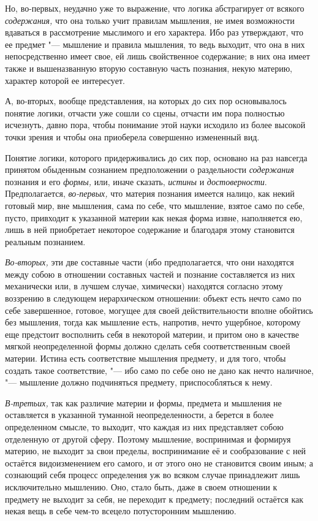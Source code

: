 Но, во-первых, неудачно уже то выражение, что логика абстрагирует от всякого
{\em содержания,} что она только учит правилам
мышления, не имея возможности вдаваться в рассмотрение мыслимого и его
характера. Ибо раз утверждают, что ее предмет "--- мышление и правила
мышления, то ведь выходит, что она в них непосредственно имеет свое, ей
лишь свойственное содержание; в них она имеет также и вышеназванную вторую
составную часть познания, некую материю, характер которой ее интересует.

А, во-вторых, вообще представления, на которых до сих пор
основывалось понятие логики, отчасти уже сошли со сцены, отчасти им
пора полностью исчезнуть, давно пора, чтобы понимание этой науки
исходило из более высокой точки зрения и чтобы она приоберела совершенно
измененный вид.

Понятие логики, которого придерживались до сих пор, основано на раз навсегда
принятом обыденным сознанием предположении о раздельности {\em содержания}
познания и его {\em формы,} или, иначе сказать, {\em истины} и
{\em достоверности}. Предполагается, {\em во-первых,} что материя познания
имеется налицо, как некий готовый мир, вне мышления, сама по себе, что
мышление, взятое само по себе, пусто, привходит к указанной материи как
некая форма извне, наполняется ею, лишь в ней приобретает некоторое
содержание и благодаря этому становится реальным познанием.

{\em Во-вторых,} эти две составные части (ибо
предполагается, что они находятся между собою в отношении составных частей
и познание составляется из них механически или, в лучшем случае, химически)
находятся согласно этому воззрению в следующем иерархическом отношении:
объект есть нечто само по себе завершенное, готовое, могущее для своей
действительности вполне обойтись без мышления, тогда как мышление есть,
напротив, нечто ущербное, которому еще предстоит восполнить себя в
некоторой материи, и притом оно в качестве мягкой неопределенной формы
должно сделать себя соответственным своей материи. Истина есть соответствие
мышления предмету, и для того, чтобы создать такое соответствие, "--- ибо само
по себе оно не дано как нечто наличное, "--- мышление должно подчиняться
предмету, приспособляться к нему.

{\em В-третьих,} так как различие материи и формы,
предмета и мышления не оставляется в указанной туманной неопределенности, а
берется в более определенном смысле, то выходит, что каждая из них
представляет собою отделенную от другой сферу. Поэтому мышление,
воспринимая и формируя материю, не выходит за свои пределы, воспринимание
её и сообразование с ней остаётся видоизменением его самого,
и от этого оно не становится своим иным; а
сознающий себя процесс определения уж во всяком случае принадлежит лишь
исключительно мышлению. Оно, стало быть, даже в своем отношении к предмету не
выходит за себя, не переходит к предмету; последний остаётся как некая вещь в себе
чем-то всецело потусторонним мышлению.

